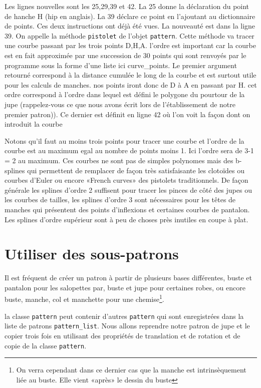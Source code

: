 \documentclass[10pt,a4paper,twoside]{report}
\begin{document}
Les lignes nouvelles sont les 25,29,39 et 42. La 25 donne la déclaration du point de hanche H (hip en anglais). La 39 déclare ce point en l'ajoutant au dictionnaire de points. Ces deux instructions ont déjà été vues. La nouveauté est dans la ligne 39. On appelle la méthode \texttt{pistolet} de l'objet \texttt{pattern}. Cette méthode va tracer une courbe passant par les trois points D,H,A. l'ordre est important car la courbe est en fait approximée par une succession de 30 points qui sont renvoyés par le programme sous la forme d'une liste ici curve\_points. Le premier argument retourné correspond à la distance cumulée le long de la courbe et est surtout utile pour les calculs de manches. nos points iront donc de D à A en passant par H. cet ordre correspond à l'ordre dans lequel est défini le polygone du pourtour de la jupe (rappelez-vous ce que nous avons écrit lors de l'établissement de notre premier patron)). Ce dernier est définit en ligne 42 où l'on voit la façon dont on introduit la courbe

Notons qu'il faut au moins trois points pour tracer une courbe et l'ordre de la courbe est au maximum egal au nombre de points moins 1. Ici l'ordre sera de 3-1 = 2 au maximum. Ces courbes ne sont pas de simples polynomes mais des b-splines qui permettent de remplacer de façon très satisfaisante les clotoïdes ou courbes d'Euler ou encore «French curves» des pistolets traditionnels. De façon générale les splines d'ordre 2 suffisent pour tracer les pinces de côté des jupes ou les courbes de tailles, les splines d'ordre 3 sont nécessaires pour les têtes de manches qui présentent des points d'inflexions et certaines courbes de pantalon. Les splines d'ordre supérieur sont à peu de choses près inutiles en coupe à plat.




\section{Utiliser des sous-patrons}
Il est fréquent de créer un patron à partir de plusieurs bases différentes, buste et pantalon pour les salopettes par, buste et jupe pour certaines robes, ou encore buste, manche, col et manchette pour une chemise\footnote{On verra cependant dans ce dernier cas que la manche est intrinsèquement liée au buste. Elle vient «après» le dessin du buste}.

la classe \texttt{pattern} peut contenir d'autres \texttt{pattern} qui sont enregistrées dans la liste de patrons \texttt{pattern\_list}. Nous allons reprendre notre patron de jupe et le copier trois fois en utilisant des propriétés de translation et de rotation et de copie de la classe \texttt{pattern}.
\end{document}
